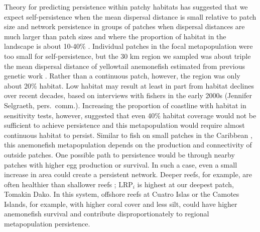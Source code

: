 \documentclass[12pt, oneside]{article}   	%
\begin{document}
Theory for predicting persistence within patchy habitats has suggested that we expect self-persistence when the mean dispersal distance is small relative to patch size and network persistence in groups of patches when dispersal distances are much larger than patch sizes and where the proportion of habitat in the landscape is about 10-40\% \citep[depending on the particular species, population, and maximum reproductive rate,][]{botsford2019population}. Individual patches in the focal metapopulation were too small for self-persistence, but the 30 km region we sampled was about triple the mean dispersal distance of yellowtail anemonefish estimated from previous genetic work \citep[8-9 km,][]{pinsky2010using, catalanoInPrepconnectivity}. Rather than a continuous patch, however, the region was only about 20\% habitat. Low habitat may result at least in part from habitat declines over recent decades, based on interviews with fishers in the early 2000s (Jennifer Selgraeth, pers.\ comm.). Increasing the proportion of coastline with habitat in sensitivity tests, however, suggested that even 40\% habitat coverage would not be sufficient to achieve persistence and this metapopulation would require almost continuous habitat to persist. Similar to fish on small patches in the Caribbean \citep{johnson2018integrating}, this anemonefish metapopulation depends on the production and connectivity of outside patches. One possible path to persistence would be through nearby patches with higher egg production or survival. In such a case, even a small increase in area could create a persistent network. Deeper reefs, for example, are often healthier than shallower reefs \citep{cinner2016bright}; $\text{LRP}_i$ is highest at our deepest patch, Tomakin Dako. In this system, offshore reefs at Cuatro Islas or the Camotes Islands, for example, with higher coral cover and less silt, could have higher anemonefish survival and contribute disproportionately to regional metapopulation persistence.

\end{document}
